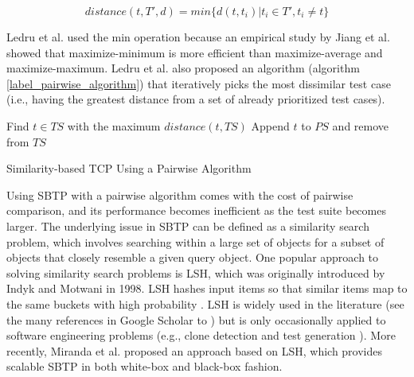 \documentclass[runningheads]{llncs}
\begin{document}
$$distance(t, T', d) = min \{d(t, t_i)| t_i \in T', t_i \neq t\} $$

Ledru et al. used the min operation because an empirical study by Jiang et al. \cite{jiang2009adaptive} showed that maximize-minimum is more efficient than maximize-average and maximize-maximum. Ledru et al. also proposed an algorithm (algorithm \ref{label_pairwise_algorithm}) that iteratively picks the most dissimilar test case (i.e., having the greatest distance from a set of already prioritized test cases).

\begin{algorithm}[h]
\label{label_pairwise_algorithm}
\SetAlgoLined
{}
Find $t\in TS$ with the maximum $distance(t, TS)$\;
Append $t$ to $PS$ and remove from $TS$\;
 \caption{Similarity-based TCP Using a Pairwise Algorithm}
\end{algorithm}

Using SBTP with a pairwise algorithm comes with the cost of pairwise comparison, and its performance becomes inefficient as the test suite becomes larger. The underlying issue in SBTP can be defined as a similarity search problem, which involves searching within a large set of objects for a subset of objects that closely resemble a given query object. One popular approach to solving similarity search problems is LSH, which was originally introduced by Indyk and Motwani \cite{indyk1998approximate} in 1998. LSH hashes input items so that similar items map to the same buckets with high probability \cite{leskovec2014mining}. LSH is widely used in the literature (see the many references in Google Scholar to \cite{indyk1998approximate}) but is only occasionally applied to software engineering problems (e.g., clone detection \cite{jiang2007deckard} and test generation \cite{shahbazi2016black}). More recently, Miranda et al. \cite{miranda2018fast} proposed an approach based on LSH, which provides scalable SBTP in both white-box and black-box fashion.
\end{document}
